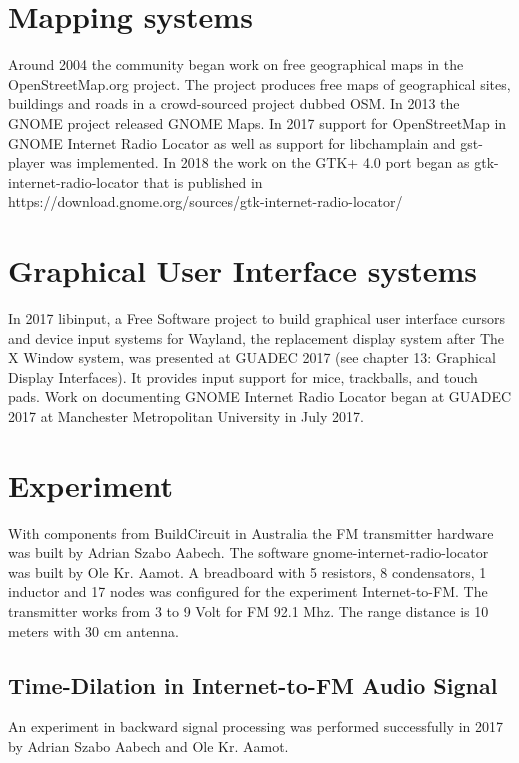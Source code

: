 \documentclass[a4paper,norsk,utf8]{report}
\begin{document}
\chapter{Mapping systems}

    Around 2004 the community began work on free geographical maps in
    the OpenStreetMap.org project.  The project produces free maps of
    geographical sites, buildings and roads in a crowd-sourced project
    dubbed OSM.  In 2013 the GNOME project released GNOME Maps.  In
    2017 support for OpenStreetMap in GNOME Internet Radio Locator as
    well as support for libchamplain and gst-player was implemented.
    In 2018 the work on the GTK+ 4.0 port began as
    gtk-internet-radio-locator that is published in
    https://download.gnome.org/sources/gtk-internet-radio-locator/

\chapter{Graphical User Interface systems}

    In 2017 libinput, a Free Software project to build graphical user
    interface cursors and device input systems for Wayland, the
    replacement display system after The X Window system, was
    presented at GUADEC 2017 (see chapter 13: Graphical Display
    Interfaces).  It provides input support for mice, trackballs, and
    touch pads.  Work on documenting GNOME Internet Radio Locator
    began at GUADEC 2017 at Manchester Metropolitan University in July
    2017.

\chapter{Experiment}

    With components from BuildCircuit in Australia the FM transmitter
    hardware was built by Adrian Szabo Aabech.  The software
    gnome-internet-radio-locator was built by Ole Kr. Aamot.  A
    breadboard with 5 resistors, 8 condensators, 1 inductor and 17
    nodes was configured for the experiment Internet-to-FM.  The
    transmitter works from 3 to 9 Volt for FM 92.1 Mhz.  The range
    distance is 10 meters with 30 cm antenna.

\section{Time-Dilation in Internet-to-FM Audio Signal}

    An experiment in backward signal processing was performed
    successfully in 2017 by Adrian Szabo Aabech and Ole Kr. Aamot.
\end{document}
